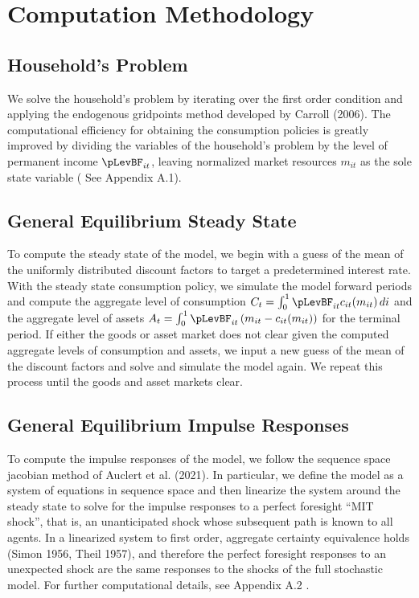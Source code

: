 \documentclass[titlepage]{\econtex}\providecommand{\texname}{BufferStockTheory}
\begin{document}
\hypertarget{Computational Methodology}{}
\section{Computation Methodology}

\hypertarget{Household's Problem}{}
\subsection{Household's Problem}

We solve the household's problem by iterating over the first order condition and applying the endogenous gridpoints method developed by Carroll (2006). The computational efficiency for obtaining the consumption policies is greatly improved by dividing the variables of the household's problem by the level of permanent income $\pLevBF_{it}$, leaving normalized market resources $m_{it}$ as the sole state variable ( See Appendix  A.1).  

\hypertarget{General Equilibrium Steady State}{}
\subsection{General Equilibrium Steady State}

To compute the steady state of the model, we begin with a guess of the mean of the uniformly distributed discount factors to target a predetermined interest rate.  With the steady state consumption policy, we simulate the model forward periods and compute the aggregate level of consumption $ C_{t} =  \int_{0}^{1} \pLevBF_{it} c_{it}(m_{it})\, di$  and the aggregate level of assets $ A_{t} = \int_{0}^{1} \pLevBF_{it} \left( m_{it} -  c_{it}(m_{it}) \right)$ for the terminal period. If either the goods or asset market does not clear given the computed aggregate levels of consumption and assets,  we input a new guess of the mean of the discount factors and solve and simulate the model again. We repeat this process until the goods and asset markets clear.  


\hypertarget{General Equilibrium Impulse Responses}{}
\subsection{General Equilibrium Impulse Responses}

To compute the impulse responses of the model, we follow the sequence space jacobian method of Auclert et al. (2021). In particular, we define the model as a system of equations in sequence space and then linearize the system around the steady state to solve for the impulse responses to a perfect foresight ``MIT shock'', that is, an unanticipated shock whose subsequent path is known to all agents.  In a linearized system to first order, aggregate certainty equivalence holds (Simon 1956, Theil 1957),  and therefore the perfect foresight responses to an unexpected shock are the same responses to the shocks of the full stochastic model. For further computational details, see Appendix A.2 . 
\end{document}
